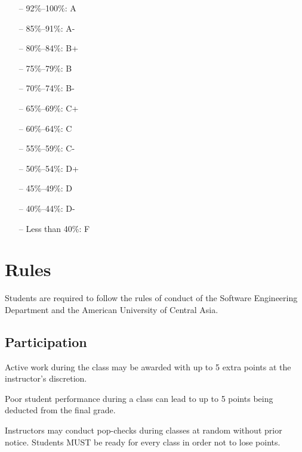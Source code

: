 \documentclass[12pt,a4paper,oneside]{article}
\begin{document}
            \begin{itemize} \itemsep-10pt \parskip0pt 
                \item[--] 92\%--100\%: A\\
                \item[--] 85\%--91\%: A-\\
                \item[--] 80\%--84\%: B+\\
                \item[--] 75\%--79\%: B\\
                \item[--] 70\%--74\%: B-\\
                \item[--] 65\%--69\%: C+\\
                \item[--] 60\%--64\%: C\\
                \item[--] 55\%--59\%: C-\\
                \item[--] 50\%--54\%: D+\\
                \item[--] 45\%--49\%: D\\
                \item[--] 40\%--44\%: D-\\
                \item[--] Less than 40\%: F
            \end{itemize}

    \section{Rules}

        Students are required to follow the rules of conduct of the Software Engineering Department and the American University of Central Asia.

    \subsection{Participation}
    
        Active work during the class may be awarded with up to 5 extra points at the instructor’s discretion.

        Poor student performance during a class can lead to up to 5 points being deducted from the final grade.

        Instructors may conduct pop-checks during classes at random without prior notice. Students MUST be ready for every class in order not to lose points.
\end{document}
